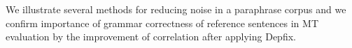 We illustrate several methods for reducing noise in a paraphrase corpus and
we confirm importance of grammar correctness of reference sentences in MT 
evaluation by the improvement of correlation after applying Depfix.


